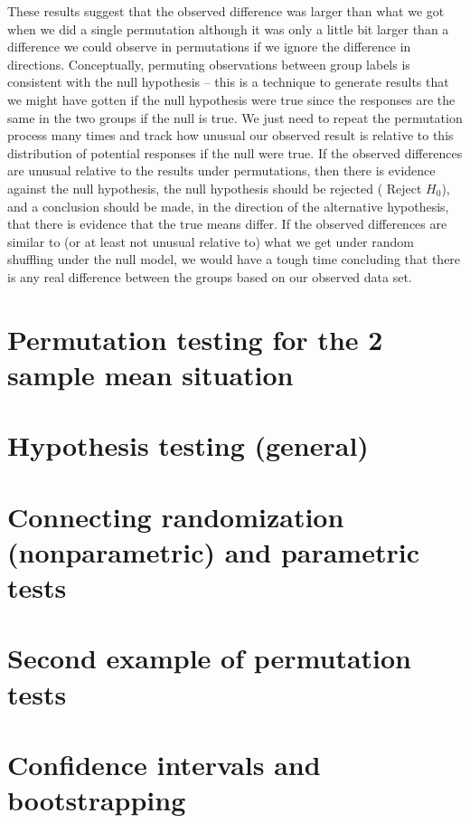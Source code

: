 \documentclass[]{book}
\begin{document}
These results suggest that the observed difference was larger than what
we got when we did a single permutation although it was only a little
bit larger than a difference we could observe in permutations if we
ignore the difference in directions. Conceptually, permuting
observations between group labels is consistent with the null hypothesis
-- this is a technique to generate results that we might have gotten if
the null hypothesis were true since the responses are the same in the
two groups if the null is true. We just need to repeat the permutation
process many times and track how unusual our observed result is relative
to this distribution of potential responses if the null were true. If
the observed differences are unusual relative to the results under
permutations, then there is evidence against the null hypothesis, the
null hypothesis should be rejected ( Reject \(H_0\)), and a conclusion
should be made, in the direction of the alternative hypothesis, that
there is evidence that the true means differ. If the observed
differences are similar to (or at least not unusual relative to) what we
get under random shuffling under the null model, we would have a tough
time concluding that there is any real difference between the groups
based on our observed data set.

\section{Permutation testing for the 2 sample mean
situation}\label{section_2-4}

\section{Hypothesis testing (general)}\label{section_2-5}

\section{Connecting randomization (nonparametric) and parametric
tests}\label{section_2-6}

\section{Second example of permutation tests}\label{section_2-7}

\section{Confidence intervals and bootstrapping}\label{section_2-8}
\end{document}
